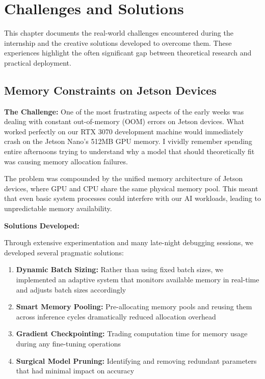 \documentclass[12pt,a4paper]{report}
\begin{document}
\chapter{Challenges and Solutions}

This chapter documents the real-world challenges encountered during the internship and the creative solutions developed to overcome them. These experiences highlight the often significant gap between theoretical research and practical deployment.

\section{Memory Constraints on Jetson Devices}

\textbf{The Challenge:} One of the most frustrating aspects of the early weeks was dealing with constant out-of-memory (OOM) errors on Jetson devices. What worked perfectly on our RTX 3070 development machine would immediately crash on the Jetson Nano's 512MB GPU memory. I vividly remember spending entire afternoons trying to understand why a model that should theoretically fit was causing memory allocation failures.

The problem was compounded by the unified memory architecture of Jetson devices, where GPU and CPU share the same physical memory pool. This meant that even basic system processes could interfere with our AI workloads, leading to unpredictable memory availability.

\textbf{Solutions Developed:}

Through extensive experimentation and many late-night debugging sessions, we developed several pragmatic solutions:

\begin{enumerate}
    \item \textbf{Dynamic Batch Sizing:} Rather than using fixed batch sizes, we implemented an adaptive system that monitors available memory in real-time and adjusts batch sizes accordingly
    \item \textbf{Smart Memory Pooling:} Pre-allocating memory pools and reusing them across inference cycles dramatically reduced allocation overhead
    \item \textbf{Gradient Checkpointing:} Trading computation time for memory usage during any fine-tuning operations
    \item \textbf{Surgical Model Pruning:} Identifying and removing redundant parameters that had minimal impact on accuracy
\end{enumerate}
\end{document}
